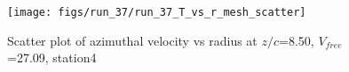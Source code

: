 \begin{figure}[H]
\centering
\texttt{[image: figs/run\_37/run\_37\_T\_vs\_r\_mesh\_scatter]}
\caption{Scatter plot of azimuthal velocity vs radius at $z/c$=8.50, $V_{free}$=27.09, station4}
\label{fig:run_37_T_vs_r_mesh_scatter}
\end{figure}


